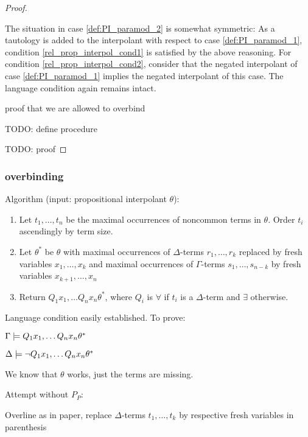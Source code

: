 \begin{proof}
\begin{itemize}
			The situation in case \ref{def:PI_paramod_2} is somewhat symmetric: 
			As a tautology is added to the interpolant with respect to case \ref{def:PI_paramod_1}, condition \ref{rel_prop_interpol_cond1} is satisfied by the above reasoning.
			For condition \ref{rel_prop_interpol_cond2}, consider that the negated interpolant of case \ref{def:PI_paramod_1} implies the negated interpolant of this case.
			The language condition again remains intact.
			\qedhere
	\end{itemize}

	proof that we are allowed to overbind

	TODO: define procedure

	TODO: proof

	\end{proof}


	\subsubsection{overbinding}

	Algorithm (input: propositional interpolant $\theta$):
	\begin{enumerate}
		\item Let $t_1, \ldots, t_n$ be the maximal occurrences of noncommon terms in $\theta$. Order $t_i$ ascendingly by term size. 
		\item Let $\theta^*$ be $\theta$ with maximal occurrences of $\Delta$-terms $r_1, \ldots, r_k$ replaced by fresh variables $x_1, \ldots, x_k$ and maximal occurrences of $\Gamma$-terms $s_1, \ldots, s_{n-k}$ by fresh variables $x_{k+1}, \ldots, x_{n}$
		\item Return $Q_1 x_1, \ldots Q_n x_n \theta^*$, where $Q_i$ is $\forall$ if $t_i$ is a $\Delta$-term and $\exists$ otherwise.
	\end{enumerate}

	Language condition easily established. To prove:

	$\Gamma \models Q_1 x_1, \ldots Q_n x_n \theta^*$

	$\Delta \models \lnot Q_1 x_1, \ldots Q_n x_n \theta^*$

	We know that $\theta$ works, just the terms are missing.

	\clearpage
	Attempt without $P_P$:


	\begin{defi}
		\label{def:overline}
		Overline as in paper, replace $\Delta$-terms $t_1, \ldots, t_k$ by respective fresh variables in parenthesis
	\end{defi}

